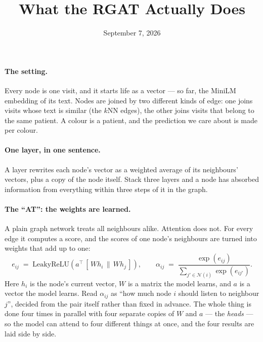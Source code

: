 \documentclass[11pt]{article}
\title{What the RGAT Actually Does}
\author{}
\date{September 7, 2026}
\begin{document}
\maketitle
\vspace{-2em}

\paragraph{The setting.} Every node is one visit, and it starts life as a vector --- so far,
the MiniLM embedding of its text. Nodes are joined by two different kinds of edge: one joins
visits whose text is similar (the $k$NN edges), the other joins visits that belong to the same
patient. A colour is a patient, and the prediction we care about is made per colour.

\paragraph{One layer, in one sentence.} A layer rewrites each node's vector as a weighted
average of its neighbours' vectors, plus a copy of the node itself. Stack three layers and a
node has absorbed information from everything within three steps of it in the graph.

\paragraph{The ``AT'': the weights are learned.} A plain graph network treats all neighbours
alike. Attention does not. For every edge it computes a score, and the scores of one node's
neighbours are turned into weights that add up to one:
\[
  e_{ij} \;=\; \mathrm{LeakyReLU}\!\left(a^{\top}\,[\,W h_i \,\|\, W h_j\,]\right),
  \qquad
  \alpha_{ij} \;=\; \frac{\exp(e_{ij})}{\sum_{j' \in \mathcal{N}(i)} \exp(e_{ij'})}.
\]
Here $h_i$ is the node's current vector, $W$ is a matrix the model learns, and $a$ is a vector
the model learns. Read $\alpha_{ij}$ as ``how much node $i$ should listen to neighbour $j$'',
decided from the pair itself rather than fixed in advance. The whole thing is done four times
in parallel with four separate copies of $W$ and $a$ --- the \emph{heads} --- so the model can
attend to four different things at once, and the four results are laid side by side.
\end{document}

